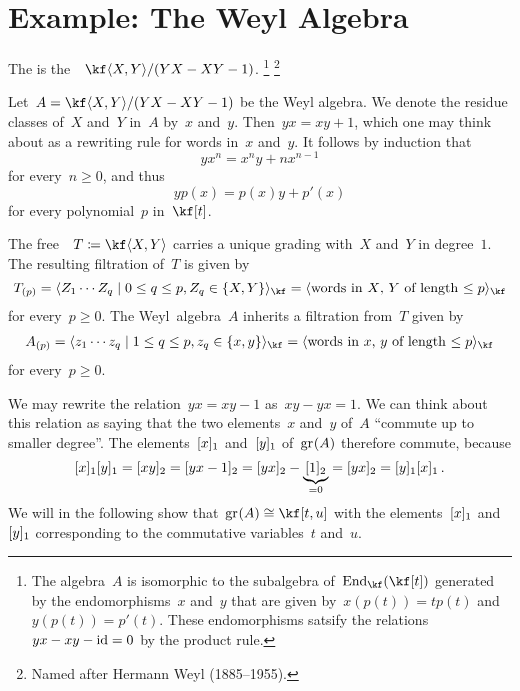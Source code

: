 \section{Example: The Weyl Algebra}




\begin{definition}
	The  is the~\algebra{$\kf$}~$\kf\gen{X, Y} / \ideal{YX - XY - 1}$.%
	\footnote{The algebra~$A$ is isomorphic to the subalgebra of~$\End_{\kf}(\kf[t])$ generated by the endomorphisms~$x$ and~$y$ that are given by~$x(p(t)) = t p(t)$ and~$y(p(t)) = p'(t)$.
	These endomorphisms satsify the relations~$yx - xy - \mathrm{id} = 0$ by the product rule.}%
	\multiplefootnoteseparator%
	\footnote{Named after Hermann Weyl (1885--1955).}
\end{definition}


\begin{fluff}
	\label{filtration on the weyl algebra}
	Let~$A = \kf\gen{X,Y} / \ideal{YX - XY - 1}$ be the Weyl algebra.
	We denote the residue classes of~$X$ and~$Y$ in~$A$ by~$x$ and~$y$.
	Then~$yx = xy + 1$, which one may think about as a rewriting rule for words in~$x$ and~$y$.
	It follows by induction that
	\[
		y x^n
		=
		x^n y + n x^{n-1}
	\]
	for every~$n \geq 0$, and thus
	\[
		y p(x)
		=
		p(x) y + p'(x)
	\]
	for every polynomial~$p$ in~$\kf[t]$.
	
	The free~{\algebra{$\kf$}}~$T \defined \kf\gen{X, Y}$ carries a unique grading with~$X$ and~$Y$ in degree~$1$.
	The resulting filtration of~$T$ is given by
	\[
		T_{(p)}
		=
		\gen{
			Z_1 \dotsm Z_q
		\suchthat
			0 \leq q \leq p,
			Z_q \in \{X, Y\}
		}_{\kf}
		=
		\gen{
			\text{words in~$X$,~$Y$ of length~$\leq p$}
		}_{\kf}
	\]
	for every~$p \geq 0$.
	The Weyl~algebra~$A$ inherits a filtration from~$T$ given by
	\begin{align*}
		A_{(p)}
		=
		\gen{
			z_1 \dotsm z_q
		\suchthat
			1 \leq q \leq p,
			z_q \in \{x, y\}
		}_{\kf}
		=
		\gen{
			\text{words in~$x$,~$y$ of length~$\leq p$}
		}_{\kf}
	\end{align*}
	for every~$p \geq 0$.

	We may rewrite the relation~$yx = xy - 1$ as~$xy - yx = 1$.
	We can think about this relation as saying that the two elements~$x$ and~$y$ of~$A$ \enquote{commute up to smaller degree}.
	The elements~$\lbrack x\rbrack_1$ and~$\lbrack y\rbrack_1$ of~$\gr(A)$ therefore commute, because
	\[
		\lbrack x\rbrack_1 \lbrack y\rbrack_1
		=
		\lbrack xy\rbrack_2
		=
		\lbrack yx - 1\rbrack_2
		=
		\lbrack yx\rbrack_2 - \underbrace{ \lbrack1\rbrack_2 }_{=0}
		=
		\lbrack yx \rbrack_2
		=
		\lbrack y\rbrack_1 \lbrack x\rbrack_1 \,.
	\]
	We will in the following show that~$\gr(A) \cong \kf[t,u]$ with the elements~$\lbrack x\rbrack_1$ and~$\lbrack y\rbrack_1$ corresponding to the commutative variables~$t$ and~$u$.
\end{fluff}



